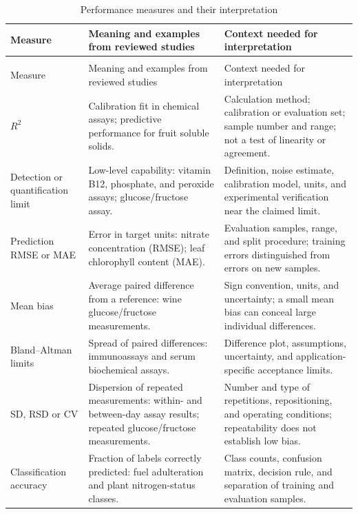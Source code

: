 \begingroup
\setlength{\tabcolsep}{4pt}
\begin{xltabular}{\textwidth}{@{}>{\raggedright\arraybackslash}p{.17\textwidth} >{\raggedright\arraybackslash}X >{\raggedright\arraybackslash}X@{}}
\caption{Performance measures and their interpretation}\label{tab:metricguide}\\
\toprule
Measure & Meaning and examples from reviewed studies & Context needed for interpretation \\
\midrule
\endfirsthead
{} \\
\toprule
Measure & Meaning and examples from reviewed studies & Context needed for interpretation \\
\midrule
\endhead
$R^2$ & Calibration fit in chemical assays;\citep{laganovska2020portable} predictive performance for fruit soluble solids.\citep{tran2020portable} & Calculation method; calibration or evaluation set; sample number and range; not a test of linearity or agreement. \\
Detection or quantification limit & Low-level capability: vitamin B12, phosphate, and peroxide assays;\citep{laganovska2020portable} glucose/fructose assay.\citep{tonelli2025portable} & Definition, noise estimate, calibration model, units, and experimental verification near the claimed limit. \\
Prediction RMSE or MAE & Error in target units: nitrate concentration (RMSE);\citep{bulusu2024technical} leaf chlorophyll content (MAE).\citep{lopin2025evaluation} & Evaluation samples, range, and split procedure; training errors distinguished from errors on new samples. \\
Mean bias & Average paired difference from a reference: wine glucose/fructose measurements.\citep{tonelli2025portable} & Sign convention, units, and uncertainty; a small mean bias can conceal large individual differences. \\
Bland--Altman limits & Spread of paired differences: immunoassays\citep{long2014smartphone} and serum biochemical assays.\citep{luo2021smartphone} & Difference plot, assumptions, uncertainty, and application-specific acceptance limits. \\
SD, RSD or CV & Dispersion of repeated measurements: within- and between-day assay results;\citep{laganovska2020portable} repeated glucose/fructose measurements.\citep{tonelli2025portable} & Number and type of repetitions, repositioning, and operating conditions; repeatability does not establish low bias. \\
Classification accuracy & Fraction of labels correctly predicted: fuel adulteration\citep{dantas2017inexpensive} and plant nitrogen-status classes.\citep{habibullah2020low} & Class counts, confusion matrix, decision rule, and separation of training and evaluation samples. \\
\bottomrule

\end{xltabular}
\endgroup


